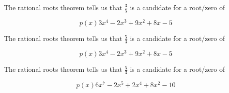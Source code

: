 \documentclass{ximera}
\author{Lee Wayand}
\begin{document}
\begin{exercise}






\begin{question}

The rational roots theorem tells us that $\frac{3}{5}$ is a candidate for a root/zero of 

\[
p(x) 3x^4 - 2x^3 + 9x^2 + 8x - 5
\]


\begin{multipleChoice}
\end{multipleChoice}




\end{question}








\begin{question}

The rational roots theorem tells us that $\frac{5}{3}$ is a candidate for a root/zero of 

\[
p(x) 3x^4 - 2x^3 + 9x^2 + 8x - 5
\]


\begin{multipleChoice}
\end{multipleChoice}




\end{question}














\begin{question}

The rational roots theorem tells us that $\frac{5}{3}$ is a candidate for a root/zero of 

\[
p(x) 6x^7 - 2x^5 + 2x^4 + 8x^2 - 10
\]


\begin{multipleChoice}
\end{multipleChoice}




\end{question}














\end{exercise}
\end{document}

